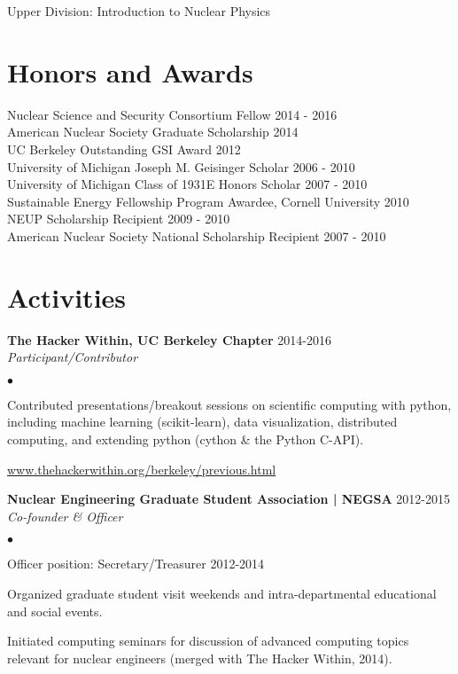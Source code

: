\documentclass[margin,line]{res}
\newenvironment{list1}{
  \begin{list}{\ding{113}}{%
      \setlength{\itemsep}{0in}
      \setlength{\parsep}{0in} \setlength{\parskip}{0in}
      \setlength{\topsep}{0in} \setlength{\partopsep}{0in} 
      \setlength{\leftmargin}{0.17in}}}{\end{list}}
\newenvironment{list2}{
  \begin{list}{$\bullet$}{%
      \setlength{\itemsep}{0in}
      \setlength{\parsep}{0in} \setlength{\parskip}{0in}
      \setlength{\topsep}{0in} \setlength{\partopsep}{0in} 
      \setlength{\leftmargin}{0.2in}}}{\end{list}}
\begin{document}
\begin{resume}
\begin{list1}
  \item[] Upper Division: Introduction to Nuclear Physics
\end{list1}

\section{\sc Honors and Awards} 

Nuclear Science and Security Consortium Fellow \hfill 2014 - 2016 \\
American Nuclear Society Graduate Scholarship \hfill 2014 \\
UC Berkeley Outstanding GSI Award \hfill 2012 \\
University of Michigan Joseph M. Geisinger Scholar \hfill 2006 - 2010 \\
University of Michigan Class of 1931E Honors Scholar \hfill 2007 - 2010 \\
Sustainable Energy Fellowship Program Awardee, Cornell University \hfill 2010 \\
NEUP Scholarship Recipient \hfill 2009 - 2010 \\
American Nuclear Society National Scholarship Recipient \hfill 2007 - 2010 \\

\section{\sc Activities}

{\bf The Hacker Within, UC Berkeley Chapter} \hfill 2014-2016 \\ 
{\em Participant/Contributor} 

\begin{list2}
  \item Contributed presentations/breakout sessions on scientific computing
        with python, including machine learning (scikit-learn), data
        visualization, distributed computing, and extending python 
        (cython \& the Python C-API).
  \item \url{www.thehackerwithin.org/berkeley/previous.html}
\end{list2}

{\bf Nuclear Engineering Graduate Student Association | NEGSA} \hfill 2012-2015\\
{\em Co-founder \& Officer} 

\begin{list2}
  \item Officer position: Secretary/Treasurer \hfill 2012-2014
  \item Organized graduate student visit weekends and intra-departmental 
        educational and social events.
  \item Initiated computing seminars for discussion of advanced computing 
        topics relevant for nuclear engineers (merged with The Hacker Within,
        2014).
\end{list2}


\end{resume}
\end{document}
